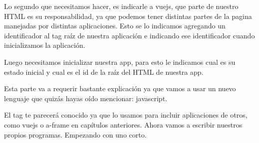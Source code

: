 \documentclass[letterpaper,10pt,spanish]{sphinxmanual}
\begin{document}
%
\begin{sphinxVerbatim}[commandchars=\\\{\}]
 
\end{sphinxVerbatim}



Lo segundo que necesitamos hacer, es indicarle a vuejs, que parte de nuestro HTML
es su responsabilidad, ya que podemos tener distintas partes de la pagina manejadas
por distintas aplicaciones. Esto se lo indicamos agregando un identificador al tag
raíz de nuestra aplicación e indicando ese identificador cuando inicializamos la
aplicación.

%
\begin{sphinxVerbatim}[commandchars=\\\{\}]
 
\end{sphinxVerbatim}

Luego necesitamos inicializar nuestra app, para esto le indicamos cual es su
estado inicial y cual es el id de la raíz del HTML de nuestra app.

Esta parte va a requerir bastante explicación ya que vamos a usar un nuevo
lenguaje que quizás hayas oído mencionar: javascript.

%
\begin{sphinxVerbatim}[commandchars=\\\{\}]
   
     
      
\end{sphinxVerbatim}

El tag  te parecerá conocido ya que lo usamos para incluir aplicaciones
de otros, como vuejs o a-frame en capítulos anteriores. Ahora vamos a escribir
nuestros propios programas. Empezando con uno corto.
\end{document}
